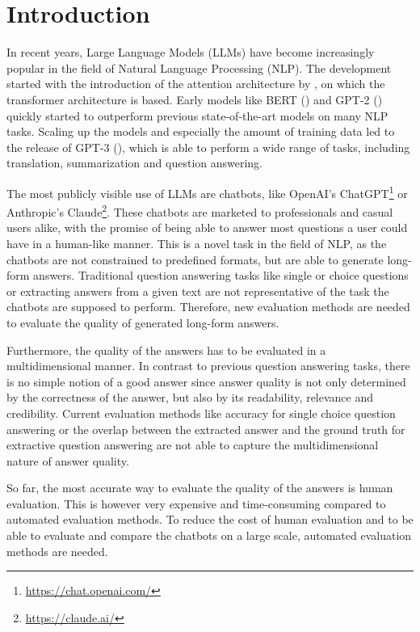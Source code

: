 \chapter{Introduction}\label{structure}
In recent years, Large Language Models (LLMs) have become increasingly popular in the field of Natural Language Processing (NLP).
The development started with the introduction of the attention architecture by \cite{vaswani:2017:Attention}, on which the transformer architecture is based.
Early models like BERT (\cite{devlin:2018:BERT}) and GPT-2 (\cite{radford:2018:Improving}) quickly started to outperform previous state-of-the-art models on many NLP tasks.
Scaling up the models and especially the amount of training data led to the release of GPT-3 (\cite{brown:2020:Language}), which is able to perform a wide range of tasks, including translation, summarization and question answering.

The most publicly visible use of LLMs are chatbots, like OpenAI's ChatGPT\footnote{\url{https://chat.openai.com/}} or Anthropic's Claude\footnote{\url{https://claude.ai/}}.
These chatbots are marketed to professionals and casual users alike, with the promise of being able to answer most questions a user could have in a human-like manner.
This is a novel task in the field of NLP, as the chatbots are not constrained to predefined formats, but are able to generate long-form answers.
Traditional question answering tasks like single or choice questions or extracting answers from a given text are not representative of the task the chatbots are supposed to perform.
Therefore, new evaluation methods are needed to evaluate the quality of generated long-form answers.

Furthermore, the quality of the answers has to be evaluated in a multidimensional manner.
In contrast to previous question answering tasks, there is no simple notion of a good answer since answer quality is not only determined by the correctness of the answer, but also by its readability, relevance and credibility.
Current evaluation methods like accuracy for single choice question answering or the overlap between the extracted answer and the ground truth for extractive question answering are not able to capture the multidimensional nature of answer quality.

So far, the most accurate way to evaluate the quality of the answers is human evaluation.
This is however very expensive and time-consuming compared to automated evaluation methods.
To reduce the cost of human evaluation and to be able to evaluate and compare the chatbots on a large scale, automated evaluation methods are needed.

